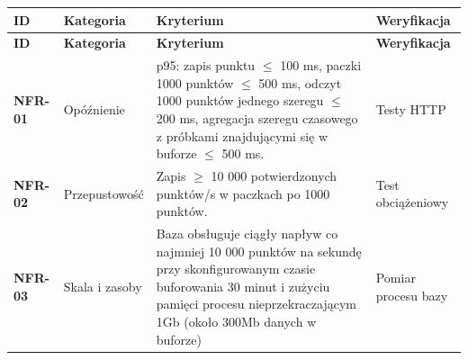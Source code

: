 \documentclass[12pt,a4paper]{article}
\begin{document}
\begingroup
\small
\begin{longtable}{>{\raggedright\arraybackslash}p{}>{\raggedright\arraybackslash}p{}>{\raggedright\arraybackslash}p{}>{\raggedright\arraybackslash}p{}}
    \hline
    \textbf{ID}                                                                                                                   & \textbf{Kategoria}                                                                      & \textbf{Kryterium}                                                                                                                                                                                               & \textbf{Weryfikacja}                          \\
    \hline
    \endfirsthead
    \textbf{ID}                                                                                                                   & \textbf{Kategoria}                                                                      & \textbf{Kryterium}                                                                                                                                                                                               & \textbf{Weryfikacja}                          \\
    \hline
    \endhead
    \textbf{NFR-01}                                                                                                               & Opóźnienie                                                                              & p95: zapis punktu \(\leq\) 100 ms, paczki 1000 punktów \(\leq\) 500 ms, odczyt 1000 punktów jednego szeregu \(\leq\) 200 ms, agregacja szeregu czasowego z próbkami znajdującymi się w buforze  \(\leq\) 500 ms. & Testy HTTP                                    \\
    \hline
    \textbf{NFR-02}                                                                                                               & Przepustowość                                                                           & Zapis \(\geq\) 10 000 potwierdzonych punktów/s w paczkach po 1000 punktów.                                                                                                                                       & Test obciążeniowy                             \\
    \hline
    \textbf{NFR-03}                                                                                                               & Skala i zasoby                                                                          & Baza obsługuje ciągły napływ co najmniej 10 000 punktów na sekundę przy skonfigurowanym czasie buforowania 30 minut i zużyciu pamięci procesu nieprzekraczającym 1Gb (około 300Mb danych w buforze)              & Pomiar procesu bazy                           \\

\end{longtable}
\end{document}
